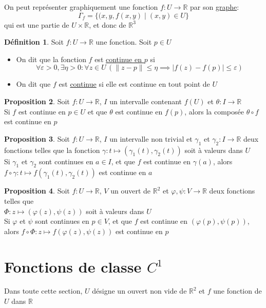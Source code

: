 \documentclass[10pt,a4paper]{article}
\theoremstyle{definition}
\newtheorem{proposition}{Proposition}[section]
\newtheorem{definition}[proposition]{Définition}
\begin{document}
\noindent On peut représenter graphiquement une fonction $f: U \to \mathbb{R}$ par son \uline{graphe}:
\[ \Gamma_f = \{ (x, y, f(x, y) \mid (x, y) \in U \} \]
qui est une partie de $U \times \mathbb{R}$, et donc de $\mathbb{R}^3$
\begin{definition}
Soit $f: U \to \mathbb{R}$ une fonction. Soit $p \in U$
\begin{itemize}
\item On dit que la fonction $f$ est \uline{continue en $p$} si
\[ \forall \varepsilon > 0, \exists \eta> 0: \forall z \in U\, \left( \| z - p \| \leq \eta \implies |f(z) - f(p)| \leq \varepsilon \right) \]
\item On dit que $f$ est \uline{continue} si elle est continue en tout point de $U$
\end{itemize}
\end{definition}
\begin{proposition}
Soit $f: U \to \mathbb{R}$, $I$ un intervalle contenant $f(U)$ et $\theta: I \to \mathbb{R}$ \\
Si $f$ est continue en $p \in U$ et que $\theta$ est continue en $f(p)$, alors la composée $\theta \circ f$ est continue en $p$
\end{proposition}
\begin{proposition}
Soit $f: U \to \mathbb{R}$, $I$ un intervalle non trivial et $\gamma_1$ et $\gamma_2: I \to \mathbb{R}$ deux fonctions telles que la fonction $\gamma: t \mapsto \left(\gamma_1(t), \gamma_2(t)\right)$ soit à valeurs dans $U$ \\
Si $\gamma_1$ et $\gamma_2$ sont continues en $a \in I$, et que $f$ est continue en $\gamma(a)$, alors $f \circ \gamma: t \mapsto f\left(\gamma_1(t), \gamma_2(t)\right)$ est continue en $a$
\end{proposition}
\begin{proposition}
Soit $f: U \to \mathbb{R}$, $V$ un ouvert de $\mathbb{R}^2$ et $\varphi, \psi: V \to \mathbb{R}$ deux fonctions telles que \\
$\Phi: z \mapsto \left(\varphi(z), \psi(z)\right)$ soit à valeurs dans $U$ \\
Si $\varphi$ et $\psi$ sont continues en $p \in V$, et que $f$ est continue en $\left(\varphi(p), \psi(p)\right)$, alors $f \circ \Phi: z \mapsto f\left(\varphi(z), \psi(z)\right)$ est continue en $p$
\end{proposition}

\pagebreak

\section{Fonctions de classe $C^1$}
Dans toute cette section, $U$ désigne un ouvert non vide de $\mathbb{R}^2$ et $f$ une fonction de $U$ dans $\mathbb{R}$
\end{document}
